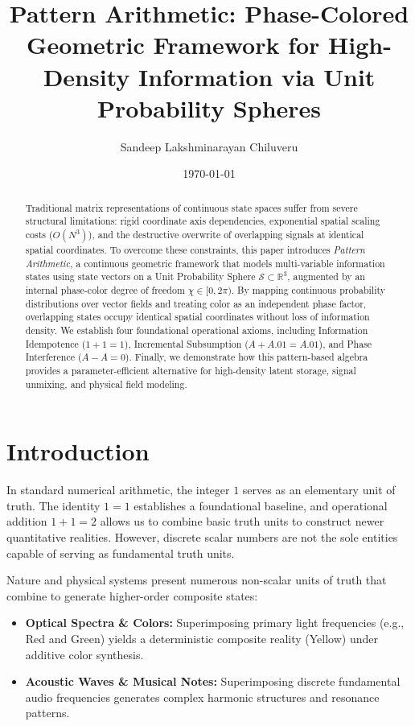 \documentclass[12pt, a4paper]{article}
\title{Pattern Arithmetic: Phase-Colored Geometric Framework for High-Density Information via Unit Probability Spheres}
\author{Sandeep Lakshminarayan Chiluveru}
\date{\today}
\begin{document}
\maketitle

\begin{abstract}
Traditional matrix representations of continuous state spaces suffer from severe structural limitations: rigid coordinate axis dependencies, exponential spatial scaling costs ($O(N^3)$), and the destructive overwrite of overlapping signals at identical spatial coordinates. To overcome these constraints, this paper introduces \textit{Pattern Arithmetic}, a continuous geometric framework that models multi-variable information states using state vectors on a Unit Probability Sphere $\mathcal{S} \subset \mathbb{R}^3$, augmented by an internal phase-color degree of freedom $\chi \in [0, 2\pi)$. By mapping continuous probability distributions over vector fields and treating color as an independent phase factor, overlapping states occupy identical spatial coordinates without loss of information density. We establish four foundational operational axioms, including Information Idempotence ($1 + 1 = 1$), Incremental Subsumption ($A + A.01 = A.01$), and Phase Interference ($A - A = 0$). Finally, we demonstrate how this pattern-based algebra provides a parameter-efficient alternative for high-density latent storage, signal unmixing, and physical field modeling.
\end{abstract}

\section{Introduction}

In standard numerical arithmetic, the integer $1$ serves as an elementary unit of truth. The identity $1 = 1$ establishes a foundational baseline, and operational addition $1 + 1 = 2$ allows us to combine basic truth units to construct newer quantitative realities. However, discrete scalar numbers are not the sole entities capable of serving as fundamental truth units.

Nature and physical systems present numerous non-scalar units of truth that combine to generate higher-order composite states:
\begin{itemize}
    \item \textbf{Optical Spectra \& Colors:} Superimposing primary light frequencies (e.g., Red and Green) yields a deterministic composite reality (Yellow) under additive color synthesis.
    \item \textbf{Acoustic Waves \& Musical Notes:} Superimposing discrete fundamental audio frequencies generates complex harmonic structures and resonance patterns.
\end{itemize}
\end{document}
